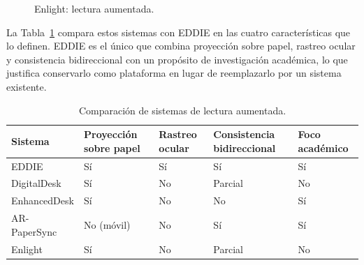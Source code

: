 \begin{figure}[H]
\centering
\begin{minipage}{0.48\textwidth}\centering
{}
\caption{Primer prototipo de DigitalDesk.}\label{fig:digitaldesk}
\end{minipage}\hfill
\begin{minipage}{0.48\textwidth}\centering
{}
\caption{Gesto de señalamiento en EnhancedDesk.}\label{fig:enhanceddesk}
\end{minipage}

\vspace{1em}
\begin{minipage}{0.48\textwidth}\centering
{}
\caption{Descripción general de AR-PaperSync.}\label{fig:arpapersync}
\end{minipage}\hfill
\begin{minipage}{0.48\textwidth}\centering
{}
\caption{Enlight: lectura aumentada.}\label{fig:enlight}
\end{minipage}
\end{figure}

La Tabla~\ref{tab:comparacion} compara estos sistemas con EDDIE en las cuatro características que lo definen. EDDIE es el único que combina proyección sobre papel, rastreo ocular y consistencia bidireccional con un propósito de investigación académica, lo que justifica conservarlo como plataforma en lugar de reemplazarlo por un sistema existente.

\begin{table}[H]
\centering
\caption{Comparación de sistemas de lectura aumentada.}
\label{tab:comparacion}
\small
\begin{tabularx}{\textwidth}{l X X X X}
\toprule
\textbf{Sistema} & \textbf{Proyección sobre papel} & \textbf{Rastreo ocular} & \textbf{Consistencia bidireccional} & \textbf{Foco académico} \\ \midrule
EDDIE & Sí & Sí & Sí & Sí \\
DigitalDesk & Sí & No & Parcial & No \\
EnhancedDesk & Sí & No & No & Sí \\
AR-PaperSync & No (móvil) & No & Sí & Sí \\
Enlight & Sí & No & Parcial & No \\ \bottomrule
\end{tabularx}
\end{table}

